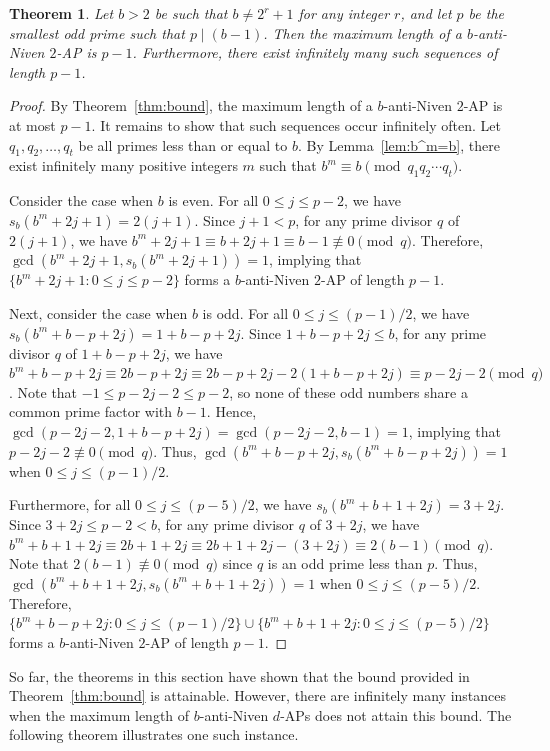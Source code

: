 \documentclass[12pt]{article}
\newtheorem{theorem}{Theorem}[section]
\theoremstyle{definition}
\begin{document}
\begin{theorem}\label{thm:2AP}
Let $b>2$ be such that $b\neq2^r+1$ for any integer $r$, and let $p$ be the smallest odd prime such that $p\mid(b-1)$. Then the maximum length of a $b$-anti-Niven $2$-AP is $p-1$. Furthermore, there exist infinitely many such sequences of length $p-1$.
\end{theorem}
\begin{proof}
By Theorem~\ref{thm:bound}, the maximum length of a $b$-anti-Niven $2$-AP is at most $p-1$. It remains to show that such sequences occur infinitely often. Let $q_1,q_2,\dotsc,q_t$ be all primes less than or equal to $b$. By Lemma~\ref{lem:b^m=b}, there exist infinitely many positive integers $m$ such that $b^m\equiv b\pmod{q_1q_2\dotsb q_t}$.

Consider the case when $b$ is even. For all $0\leq j\leq p-2$, we have $s_b(b^m+2j+1)=2(j+1)$. Since $j+1<p$, for any prime divisor $q$ of $2(j+1)$, we have $b^m+2j+1\equiv b+2j+1\equiv b-1\not\equiv0\pmod{q}$. Therefore, $\gcd(b^m+2j+1,s_b(b^m+2j+1))=1$, implying that $\{b^m+2j+1:0\leq j\leq p-2\}$ forms a $b$-anti-Niven $2$-AP of length $p-1$.

Next, consider the case when $b$ is odd. For all $0\leq j\leq(p-1)/2$, we have $s_b(b^m+b-p+2j)=1+b-p+2j$. Since $1+b-p+2j\leq b$, for any prime divisor $q$ of $1+b-p+2j$, we have $b^m+b-p+2j\equiv 2b-p+2j\equiv 2b-p+2j-2(1+b-p+2j)\equiv p-2j-2\pmod{q}$. Note that $-1\leq p-2j-2\leq p-2$, so none of these odd numbers share a common prime factor with $b-1$. Hence, $\gcd(p-2j-2,1+b-p+2j)=\gcd(p-2j-2,b-1)=1$, implying that $p-2j-2\not\equiv0\pmod{q}$. Thus, $\gcd(b^m+b-p+2j,s_b(b^m+b-p+2j))=1$ when $0\leq j\leq (p-1)/2$.

Furthermore, for all $0\leq j\leq(p-5)/2$, we have $s_b(b^m+b+1+2j)=3+2j$. Since $3+2j\leq p-2<b$, for any prime divisor $q$ of $3+2j$, we have $b^m+b+1+2j\equiv2b+1+2j\equiv2b+1+2j-(3+2j)\equiv2(b-1)\pmod{q}$. Note that $2(b-1)\not\equiv0\pmod{q}$ since $q$ is an odd prime less than $p$. Thus, $\gcd(b^m+b+1+2j,s_b(b^m+b+1+2j))=1$ when $0\leq j\leq(p-5)/2$. Therefore, $\{b^m+b-p+2j:0\leq j\leq(p-1)/2\}\cup\{b^m+b+1+2j:0\leq j\leq(p-5)/2\}$ forms a $b$-anti-Niven $2$-AP of length $p-1$.
\end{proof}

So far, the theorems in this section have shown that the bound provided in Theorem~\ref{thm:bound} is attainable. However, there are infinitely many instances when the maximum length of $b$-anti-Niven $d$-APs does not attain this bound. The following theorem illustrates one such instance.
\end{document}
